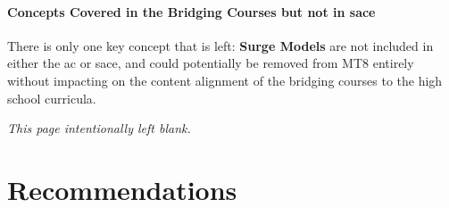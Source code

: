 \documentclass[twoside,12pt,a4paper]{report}
\makeatletter
\newcommand*{\intentionallyblankpage}{
  \vspace*{\fill}
  {\centering \textit{This page intentionally left blank.} \par}
  \vspace{\fill}}
\renewcommand*{\cleardoublepage}{\clearpage\if@twoside \ifodd\c@page\else
  \intentionallyblankpage
  \newpage
  \if@twocolumn\hbox{}\newpage\fi\fi\fi}
\makeatother
\begin{document}
\subsubsection{Concepts Covered in the Bridging Courses but not in \gls{sace}}

There is only one key concept that is left: \textbf{Surge Models} are not included in either the \gls{ac} or \gls{sace}, and could potentially be removed from MT8 entirely without impacting on the content alignment of the bridging courses to the high school curricula.	






\cleardoublepage
\chapter{Recommendations}
\label{chap:recommendations}
\end{document}
